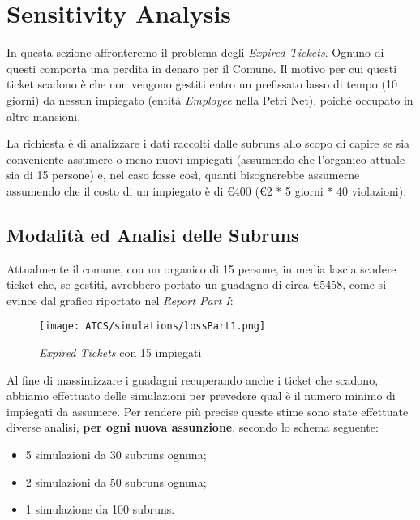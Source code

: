 \documentclass[../Relazione.tex]{subfiles}
\begin{document}
\section{Sensitivity Analysis}
     In questa sezione affronteremo il problema degli \textit{Expired Tickets}. Ognuno di questi comporta una perdita in denaro per il Comune. Il motivo per cui questi ticket scadono è che non vengono gestiti entro un prefissato lasso di tempo (10 giorni) da nessun impiegato (entità \textit{Employee} nella Petri Net), poiché occupato in altre mansioni.
     
     La richiesta è di analizzare i dati raccolti dalle subruns allo scopo di capire se sia conveniente assumere o meno nuovi impiegati (assumendo che l'organico attuale sia di 15 persone) e, nel caso fosse così, quanti bisognerebbe assumerne assumendo che il costo di un impiegato è di \euro400 (\euro2 * 5 giorni * 40 violazioni).
     
     \subsection{Modalità ed Analisi delle Subruns}
         Attualmente il comune, con un organico di 15 persone, in media lascia scadere ticket che, se gestiti, avrebbero portato un guadagno di circa \euro5458, come si evince dal grafico riportato nel \textit{Report Part I}:
         \vspace{0,5cm}
         
         \begin{figure}[!h]
             \centering
             \texttt{[image: ATCS/simulations/lossPart1.png]}
             \caption{\textit{Expired Tickets} con 15 impiegati}
             \label{fig:loss_part1}
         \end{figure}
         \vspace{0,5cm}
         Al fine di massimizzare i guadagni recuperando anche i ticket che scadono, abbiamo effettuato delle simulazioni per prevedere qual è il numero minimo di impiegati da assumere.
         \newpage
         Per rendere più precise queste stime sono state effettuate diverse analisi, \textbf{per ogni nuova assunzione}, secondo lo schema seguente:
         \begin{itemize}
             \item 5 simulazioni da 30 subruns ognuna;
             \item 2 simulazioni da 50 subruns ognuna;
             \item 1 simulazione da 100 subruns.
         \end{itemize}
         
\end{document}

